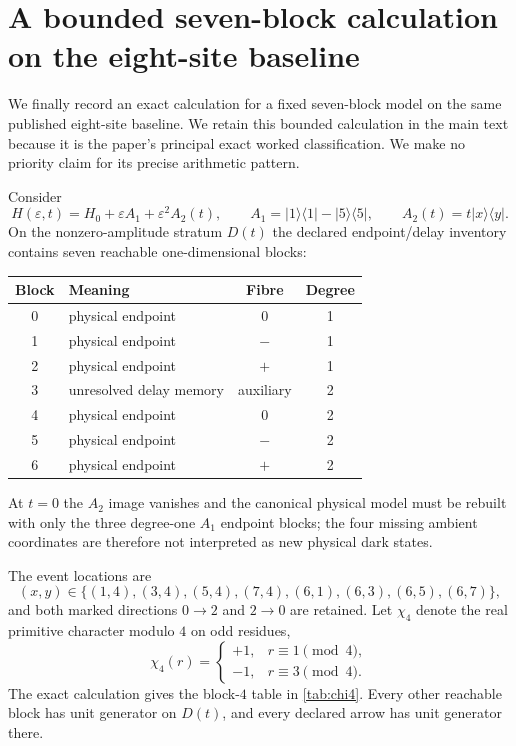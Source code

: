 \documentclass[11pt]{article}
\theoremstyle{definition}
\theoremstyle{remark}
\newcommand{\eps}{\varepsilon}
\newcommand{\ket}[1]{\lvert #1\rangle}
\newcommand{\bra}[1]{\langle #1\rvert}
\begin{document}
\section{A bounded seven-block calculation on the eight-site baseline}\label{sec:locked}

We finally record an exact calculation for a fixed seven-block model on the same published eight-site baseline. We retain this bounded calculation in the main text because it is the paper's principal exact worked classification. We make no priority claim for its precise arithmetic pattern.

Consider
\begin{equation}\label{eq:lockedfamily}
H(\eps,t)=H_0+\eps A_1+\eps^2A_2(t),
\qquad
A_1=\ket1\bra1-\ket5\bra5,
\qquad
A_2(t)=t\ket x\bra y.
\end{equation}
On the nonzero-amplitude stratum $D(t)$ the declared endpoint/delay inventory contains seven reachable one-dimensional blocks:
\begin{center}
\begin{tabular}{@{}clcc@{}}
\toprule
Block & Meaning & Fibre & Degree\\
\midrule
0 & physical endpoint & $0$ & 1\\
1 & physical endpoint & $-$ & 1\\
2 & physical endpoint & $+$ & 1\\
3 & unresolved delay memory & auxiliary & 2\\
4 & physical endpoint & $0$ & 2\\
5 & physical endpoint & $-$ & 2\\
6 & physical endpoint & $+$ & 2\\
\bottomrule
\end{tabular}
\end{center}
At $t=0$ the $A_2$ image vanishes and the canonical physical model must be rebuilt with only the three degree-one $A_1$ endpoint blocks; the four missing ambient coordinates are therefore not interpreted as new physical dark states.

The event locations are
\[
(x,y)\in\{(1,4),(3,4),(5,4),(7,4),(6,1),(6,3),(6,5),(6,7)\},
\]
and both marked directions $0\to2$ and $2\to0$ are retained. Let $\chi_4$ denote the real primitive character modulo $4$ on odd residues,
\[
\chi_4(r)=
\begin{cases}
+1,&r\equiv1\pmod4,\\
-1,&r\equiv3\pmod4.
\end{cases}
\]
The exact calculation gives the block-$4$ table in \cref{tab:chi4}. Every other reachable block has unit generator on $D(t)$, and every declared arrow has unit generator there.
\end{document}
